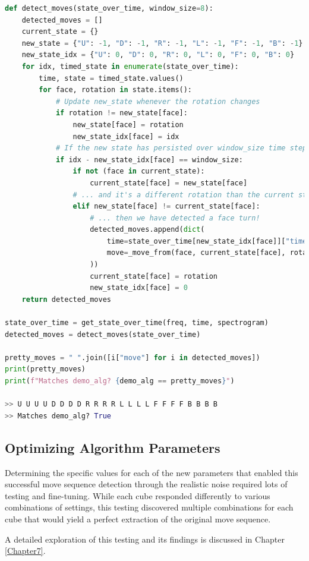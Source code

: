 \begin{lstlisting}[language=Python]
def detect_moves(state_over_time, window_size=8):                       # Edit
    detected_moves = []
    current_state = {}
    new_state = {"U": -1, "D": -1, "R": -1, "L": -1, "F": -1, "B": -1}  # New
    new_state_idx = {"U": 0, "D": 0, "R": 0, "L": 0, "F": 0, "B": 0}    # New
    for idx, timed_state in enumerate(state_over_time):
        time, state = timed_state.values()
        for face, rotation in state.items():
            # Update new_state whenever the rotation changes
            if rotation != new_state[face]:
                new_state[face] = rotation
                new_state_idx[face] = idx
            # If the new state has persisted over window_size time steps...
            if idx - new_state_idx[face] == window_size:
                if not (face in current_state):
                    current_state[face] = new_state[face]
                # ... and it's a different rotation than the current state...
                elif new_state[face] != current_state[face]:
                    # ... then we have detected a face turn!
                    detected_moves.append(dict(
                        time=state_over_time[new_state_idx[face]]["time"],
                        move=_move_from(face, current_state[face], rotation)
                    ))
                    current_state[face] = rotation
                    new_state_idx[face] = 0
    return detected_moves

state_over_time = get_state_over_time(freq, time, spectrogram)
detected_moves = detect_moves(state_over_time)

pretty_moves = " ".join([i["move"] for i in detected_moves])
print(pretty_moves)   
print(f"Matches demo_alg? {demo_alg == pretty_moves}")

>> U U U U D D D D R R R R L L L L F F F F B B B B
>> Matches demo_alg? True
\end{lstlisting}

\subsection{Optimizing Algorithm Parameters}
\label{subsec:optimizing-params}
Determining the specific values for each of the new parameters that enabled this successful move sequence detection through the realistic noise required lots of testing and fine-tuning.
While each cube responded differently to various combinations of settings, this testing discovered multiple combinations for each cube that would yield a perfect extraction of the original move sequence.

A detailed exploration of this testing and its findings is discussed in Chapter \ref{Chapter7}.
